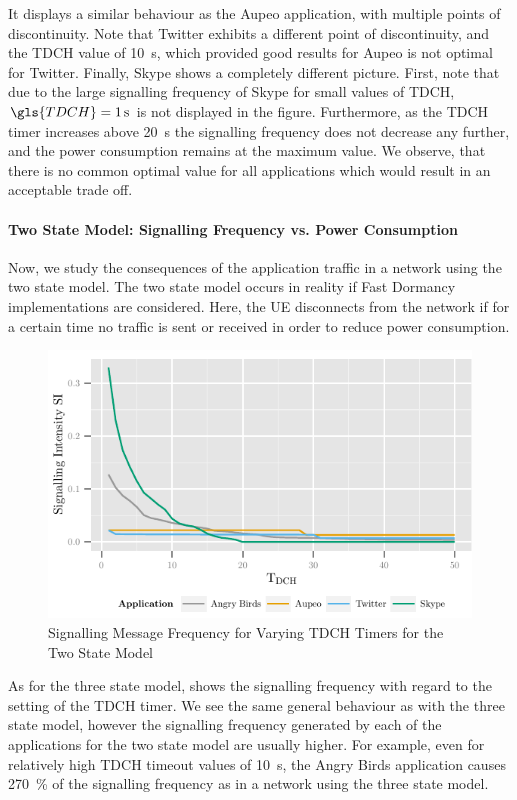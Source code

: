 It displays a similar behaviour as the Aupeo application, with multiple points of discontinuity.
Note that Twitter exhibits a different point of discontinuity, and the \gls{TDCH} value of \SI{10}{\second}, which provided good results for Aupeo is not optimal for Twitter.
Finally, Skype shows a completely different picture.
First, note that due to the large signalling frequency of Skype for small values of \gls{TDCH}, \(\gls{TDCH} = \SI{1}{\second}\) is not displayed in the figure.
Furthermore, as the \gls{TDCH} timer increases above \SI{20}{\second} the signalling frequency does not decrease any further, and the power consumption remains at the maximum value.
We observe, that there is no common optimal value for all applications which would result in an acceptable trade off.


\paragraph*{Two State Model: Signalling Frequency vs. Power Consumption}\label{sec:network:network_traces:numerical_results:two_states}
Now, we study the consequences of the application traffic in a network using the two state model.
The two state model occurs in reality if Fast Dormancy implementations are considered.
Here, the \gls{UE} disconnects from the network if for a certain time no traffic is sent or received in order to reduce power consumption.
\begin{figure}
	\centering
	\includegraphics{network/network_traces/numerical_results/figures/2_state_tdch_vs_frequency}
	\caption{Signalling Message Frequency for Varying \gls{TDCH} Timers for the Two State Model}\label{fig:network:network_traces:numerical_results:two_states:signalling}
\end{figure}
As for the three state model,  shows the signalling frequency with regard to the setting of the \gls{TDCH} timer.
We see the same general behaviour as with the three state model, however the signalling frequency generated by each of the applications for the two state model are usually higher.
For example, even for relatively high \gls{TDCH} timeout values of \SI{10}{\second}, the Angry Birds application causes \SI{270}{\percent} of the signalling frequency as in a network using the three state model.

